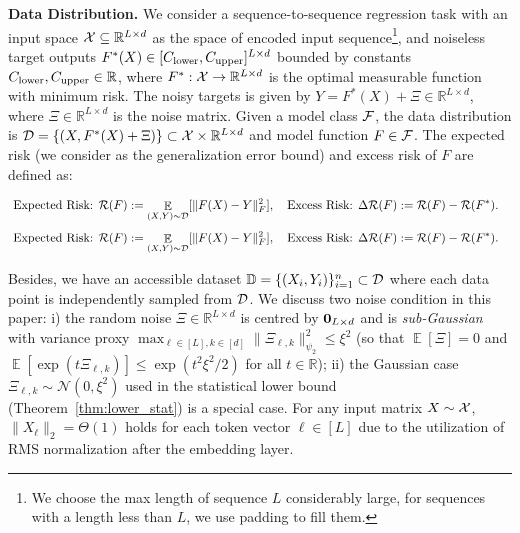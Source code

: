 \documentclass[11pt]{article}
\theoremstyle{plain}
\newcommand{\R}{\mathbb{R}}
\DeclareMathOperator*{\E}{{\mathbb{E}}}
\begin{document}
{\bf Data Distribution. }
We consider a sequence-to-sequence regression task with an input space ${\cal X} \subseteq \R^{L \times d}$ as the space of encoded input sequence\footnote{We choose the max length of sequence $L$ considerably large, for sequences with a length less than $L$, we use padding to fill them.}, and noiseless target outputs $F^*(X)\in[C_{\rm lower}, C_{\rm upper}]^{L\times d}$ bounded by constants $C_{\rm lower}, C_{\rm upper}\in\R$, where $F^*: {\cal X} \to \R^{L\times d}$ is the optimal measurable function with minimum risk. The noisy targets is given by $Y=F^*(X)+\Xi\in\R^{L\times d}$, where $\Xi\in\R^{L\times d}$ is the noise matrix.
Given a model class ${\cal F}$, the data distribution is ${\cal D} = \{(X, F^*(X)+\Xi)\} \subset {\cal X} \times \R^{L\times d}$ and model function $F \in {\cal F}$. The expected risk (we consider as the generalization error bound) and excess risk of $F$ are defined as:

\ifdefined\isarxiv
\begin{align*}
    & ~ \text{Expected Risk: }{\cal R}(F) := \E_{(X, Y) \sim {\cal D}}[ \| F(X) - Y \|_F^2], \quad \text{Excess Risk: }\Delta {\cal R}(F) := {\cal R}(F) - {\cal R}(F^*).
\end{align*}
\else
\begin{align*}
    & ~ \text{Expected Risk: }{\cal R}(F) := \E_{(X, Y) \sim {\cal D}}[ \| F(X) - Y \|_F^2], \quad \text{Excess Risk: }\Delta {\cal R}(F) := {\cal R}(F) - {\cal R}(F^*).
\end{align*}

\fi
Besides, we have an accessible dataset $\mathbb{D} = \{(X_i, Y_i)\}_{i=1}^n \subset {\cal D}$ where each data point is independently sampled from ${\cal D}$. We discuss two noise condition in this paper: i) the random noise $\Xi \in \R^{L \times d}$ is centred by ${\bf 0}_{L \times d}$ and is {\it sub-Gaussian} with variance proxy $\max_{\ell \in [L], k \in [d]} \|\Xi_{\ell, k}\|_{\psi_2}^2 \le \xi^2$ (so that $\E[\Xi]=0$ and $\E[\exp(t\Xi_{\ell,k})]\le \exp(t^2\xi^2/2)$ for all $t\in\R$); ii) the Gaussian case $\Xi_{\ell,k}\sim\mathcal{N}(0,\xi^2)$ used in the statistical lower bound (Theorem~\ref{thm:lower_stat}) is a special case. For any input matrix $X \sim {\cal X} $, $\| X_\ell \|_2 = \Theta(1)$ holds for each token vector $\ell \in [L]$ due to the utilization of RMS normalization \citep{zs19} after the embedding layer.
\end{document}
